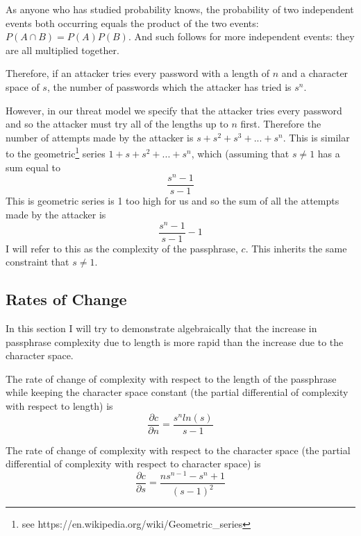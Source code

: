 \documentclass[11pt,a4paper]{article}
\begin{document}
As anyone who has studied probability knows, the probability of two independent events both occurring equals the product of the two events: $P(A \cap B)=P(A)P(B)$. And such follows for more independent events: they are all multiplied together.


Therefore, if an attacker tries every password with a length of $n$ and a character space of $s$, the number of passwords which the attacker has tried is $s^n$.

However, in our threat model we specify that the attacker tries every password and so the attacker must try all of the lengths up to $n$ first. Therefore the number of attempts made by the attacker is $s + s^2 + s^3 +...+s^n$. This is similar to the geometric\footnote{see https://en.wikipedia.org/wiki/Geometric\_series} series $1 + s + s^2 +...+s^n$, which (assuming that $s \ne 1$ has a sum equal to \[\frac{s^n - 1}{s-1}\]This is geometric series is 1 too high for us and so the sum of all the attempts made by the attacker is \[\frac{s^n - 1}{s-1} -1\]I will refer to this as the complexity of the passphrase, $c$. This inherits the same constraint that $s \ne 1$.

\subsection{Rates of Change}
In this section I will try to demonstrate algebraically that the increase in passphrase complexity due to length is more rapid than the increase due to the character space. 

The rate of change of complexity with respect to the length of the passphrase while keeping the character space constant (the partial differential of complexity with respect to length) is \[ \frac{\partial c}{\partial n} = \frac{s^n ln(s)}{s-1}\]

The rate of change of complexity with respect to the character space (the partial differential of complexity with respect to character space) is \[ \frac{\partial c}{\partial s} = \frac{ns^{n-1}-s^n+1}{(s-1)^2}\]
\end{document}
